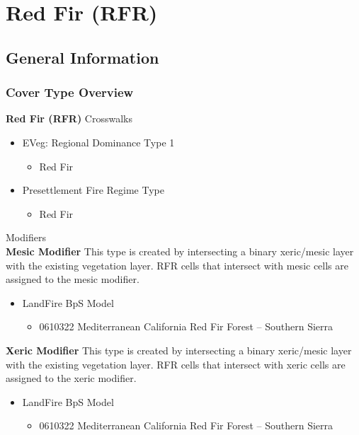\newpage
\section{Red Fir (RFR)}

\subsection*{General Information}

\subsubsection{Cover Type Overview}

\textbf{Red Fir (RFR)}
\newline
Crosswalks
\begin{itemize}
	\item EVeg: Regional Dominance Type 1
	\begin{itemize}
		\item Red Fir
	\end{itemize}

	\item Presettlement Fire Regime Type
	\begin{itemize}
		\item Red Fir
	\end{itemize}
\end{itemize}


\noindent Modifiers \\
\medskip
\noindent \textbf{Mesic Modifier } This type is created by intersecting a binary xeric/mesic layer with the existing vegetation layer. RFR cells that intersect with mesic cells are assigned to the mesic modifier.
\begin{itemize}
	\item LandFire BpS Model
	\begin{itemize}
		\item 0610322 Mediterranean California Red Fir Forest – Southern Sierra
	\end{itemize}
\end{itemize}

\noindent \textbf{Xeric Modifier} This type is created by intersecting a binary xeric/mesic layer with the existing vegetation layer. RFR cells that intersect with xeric cells are assigned to the xeric modifier.
\begin{itemize}
	\item LandFire BpS Model
	\begin{itemize}
		\item 0610322 Mediterranean California Red Fir Forest – Southern Sierra
	\end{itemize}
\end{itemize}

